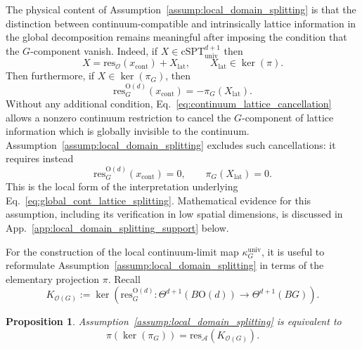 \documentclass[aps,prx,reprint,superscriptaddress,twocolumn,amsmath,amssymb,amsfonts, nofootinbib]{revtex4-2}
\newcommand{\csptu}{\mathrm{cSPT}^{d+1}_{\mathrm{univ}}}
\newcommand{\res}{\text{res}}
\theoremstyle{apsstyle}
\newtheorem{proposition}[theorem]{Proposition}
\begin{document}
The physical content of Assumption~\ref{assump:local_domain_splitting} is that the distinction between continuum-compatible and intrinsically lattice information in the global decomposition remains meaningful after imposing the condition that the $G$-component vanish. Indeed, if $X\in \csptu$ then
\begin{equation*}
    X=\res_{\mathcal O}(x_{\mathrm{cont}})+X_{\mathrm{lat}},
    \qquad
    X_{\mathrm{lat}}\in\ker(\pi).
\end{equation*}
Then furthermore, if $X\in \ker(\pi_G)$, then
\begin{equation}
    \res_G^{\mathrm{O}(d)}(x_{\mathrm{cont}})
    =
    -\pi_G(X_{\mathrm{lat}}).
    \label{eq:continuum_lattice_cancellation}
\end{equation}
Without any additional condition, Eq.~\ref{eq:continuum_lattice_cancellation} allows a nonzero continuum restriction to cancel the $G$-component of lattice information which is globally invisible to the continuum. Assumption~\ref{assump:local_domain_splitting} excludes such cancellations: it requires instead
\begin{equation*}
    \res_G^{\mathrm{O}(d)}(x_{\mathrm{cont}})=0,
    \qquad
    \pi_G(X_{\mathrm{lat}})=0.
\end{equation*}
This is the local form of the interpretation underlying Eq.~\ref{eq:global_cont_lattice_splitting}. Mathematical evidence for this assumption, including its verification in low spatial dimensions, is discussed in App.~\ref{app:local_domain_splitting_support} below.

\bigskip 

For the construction of the local continuum-limit map $\kappa_{G}^{\mathrm{univ}}$, it is useful to reformulate Assumption~\ref{assump:local_domain_splitting} in terms of the elementary projection $\pi$. Recall
\begin{equation*}
    K_{\mathcal O(G)}
    :=
    \ker\!\left(
        \res_G^{\mathrm{O}(d)}:
        \Theta^{d+1}(B\mathrm{O}(d))
        \longrightarrow
        \Theta^{d+1}(BG)
    \right).
\end{equation*}

\begin{proposition}
\label{prop:local_domain_splitting_equiv}
Assumption~\ref{assump:local_domain_splitting} is equivalent to
\begin{equation}
    \pi\!\left(\ker(\pi_G)\right)
    =
    \res_{\mathcal A}\!\left(K_{\mathcal O(G)}\right).
    \label{eq:local_domain_splitting_equiv}
\end{equation}
\end{proposition}
\end{document}
